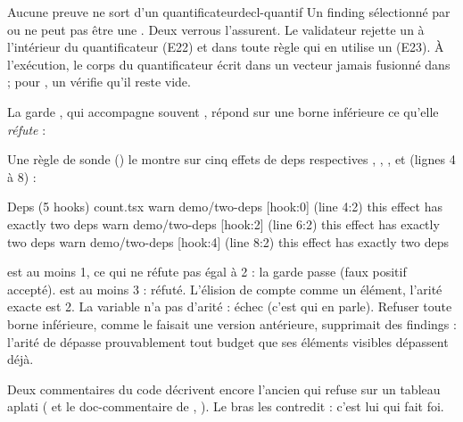\begin{invariant}{Aucune preuve ne sort d'un quantificateur}{decl-quantif}
Un finding sélectionné par  ou  ne peut pas être une \Error{}. Deux verrous l'assurent. Le validateur rejette un  à l'intérieur du quantificateur (E22) et dans toute règle qui en utilise un (E23). À l'exécution, le corps du quantificateur écrit dans un vecteur  jamais fusionné dans  ; pour , un  vérifie qu'il reste vide.
\end{invariant}

La garde , qui accompagne souvent , répond sur une borne inférieure ce qu'elle \emph{réfute} :


Une règle de sonde  () le montre sur cinq effets de deps respectives \code{[a, ...rest]}, \code{[a, b, c, ...rest]}, \code{[a, ,]},  et \code{[a, b]} (lignes 4 à 8) :
\begin{sortie}
  Deps  (5 hooks)  count.tsx
    warn   demo/two-deps  [hook:0]  (line 4:2)  this effect has exactly two deps
    warn   demo/two-deps  [hook:2]  (line 6:2)  this effect has exactly two deps
    warn   demo/two-deps  [hook:4]  (line 8:2)  this effect has exactly two deps
\end{sortie}
\code{[a, ...rest]} est au moins 1, ce qui ne réfute pas \og égal à 2\fg{} : la garde passe (faux positif accepté). \code{[a, b, c, ...rest]} est au moins 3 : réfuté. L'élision de \code{[a, ,]} compte comme un élément, l'arité exacte est 2. La variable  n'a pas d'arité : échec (c'est  qui en parle). Refuser toute borne inférieure, comme le faisait une version antérieure, supprimait des findings : l'arité de \code{[a, …, g, ...rest]} dépasse prouvablement tout budget que ses éléments visibles dépassent déjà.

\begin{piege}
Deux commentaires du code décrivent encore l'ancien  qui \og refuse\fg{} sur un tableau aplati ( et le doc-commentaire de , ). Le bras  les contredit : c'est lui qui fait foi.
\end{piege}

